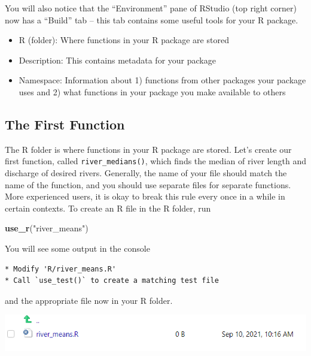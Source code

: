 \documentclass[
]{book}
\newenvironment{Shaded}{\begin{snugshade}}{\end{snugshade}}
\newcommand{\KeywordTok}[1]{\textcolor[rgb]{0.13,0.29,0.53}{\textbf{#1}}}
\newcommand{\NormalTok}[1]{#1}
\newcommand{\StringTok}[1]{\textcolor[rgb]{0.31,0.60,0.02}{#1}}
\providecommand{\tightlist}{%
  \setlength{\itemsep}{0pt}\setlength{\parskip}{0pt}}
\begin{document}
You will also notice that the ``Environment'' pane of RStudio (top right corner) now has a ``Build'' tab -- this tab contains some useful tools for your R package.

\begin{itemize}
\tightlist
\item
  R (folder): Where functions in your R package are stored
\item
  Description: This contains metadata for your package
\item
  Namespace: Information about 1) functions from other packages your package uses and 2) what functions in your package you make available to others
\end{itemize}

\hypertarget{the-first-function}{%
\subsection{The First Function}\label{the-first-function}}

The R folder is where functions in your R package are stored. Let's create our first function, called \texttt{river\_medians()}, which finds the median of river length and discharge of desired rivers. Generally, the name of your file should match the name of the function, and you should use separate files for separate functions. More experienced users, it is okay to break this rule every once in a while in certain contexts. To create an R file in the R folder, run

\begin{Shaded}
\begin{Highlighting}[]
\KeywordTok{use_r}\NormalTok{(}\StringTok{"river_means"}\NormalTok{)}
\end{Highlighting}
\end{Shaded}

You will see some output in the console

\begin{verbatim}
* Modify 'R/river_means.R'
* Call `use_test()` to create a matching test file 
\end{verbatim}

and the appropriate file now in your R folder.

\includegraphics[width=1\linewidth]{images/newrpack_function}
\end{document}
